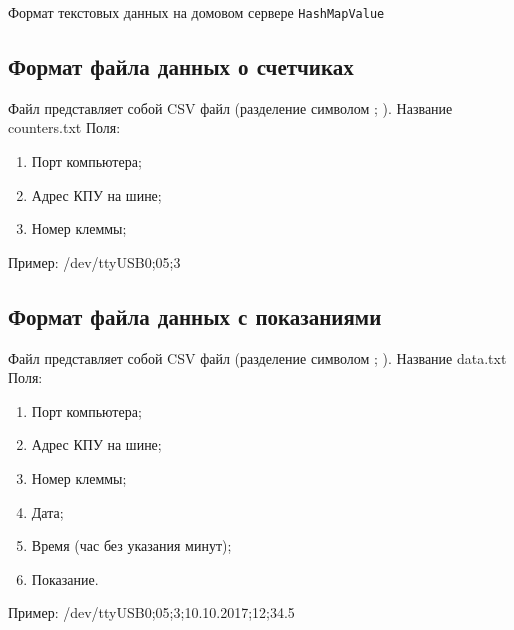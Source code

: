 \documentclass[a4paper,12pt]{article}
\begin{document}
\begin{center}
Формат текстовых данных на домовом сервере \verb|HashMapValue|
\end{center}

\subsection*{Формат файла данных о счетчиках}
Файл представляет собой CSV файл (разделение символом ; ). Название counters.txt
Поля:
\begin{enumerate}
	\item Порт компьютера;
	\item Адрес КПУ на шине;
	\item Номер клеммы;
\end{enumerate}
Пример: /dev/ttyUSB0;05;3

\subsection*{Формат файла данных с показаниями}
Файл представляет собой CSV файл (разделение символом ; ). Название data.txt
Поля:
\begin{enumerate}
	\item Порт компьютера;
	\item Адрес КПУ на шине;
	\item Номер клеммы;
	\item Дата;
	\item Время (час без указания минут);
	\item Показание.
\end{enumerate}
Пример: /dev/ttyUSB0;05;3;10.10.2017;12;34.5

\pagebreak
\end{document}
